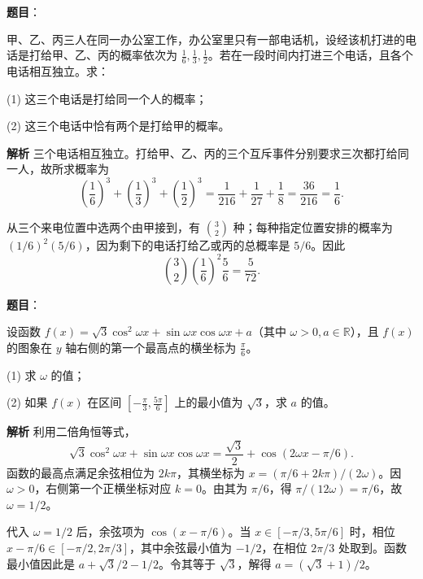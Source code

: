 \begin{answer}

\textbf{题目}：

甲、乙、丙三人在同一办公室工作，办公室里只有一部电话机，设经该机打进的电话是打给甲、乙、丙的概率依次为 \(\frac16,\frac13,\frac12\)。若在一段时间内打进三个电话，且各个电话相互独立。求：

(1) 这三个电话是打给同一个人的概率；

(2) 这三个电话中恰有两个是打给甲的概率。

\textbf{解析}
三个电话相互独立。打给甲、乙、丙的三个互斥事件分别要求三次都打给同一人，故所求概率为
\nopagebreak[4]
\[
\left(\frac16\right)^3+\left(\frac13\right)^3+\left(\frac12\right)^3
=\frac1{216}+\frac1{27}+\frac18=\frac{36}{216}=\frac16.
\]

从三个来电位置中选两个由甲接到，有 \(\binom32\) 种；每种指定位置安排的概率为 \((1/6)^2(5/6)\)，因为剩下的电话打给乙或丙的总概率是 \(5/6\)。因此
\nopagebreak[4]
\[
\binom32\left(\frac16\right)^2\frac56=\frac5{72}.
\]



\end{answer}
\begin{answer}

\textbf{题目}：

设函数 \(f(x)=\sqrt3\cos^2\omega x+\sin\omega x\cos\omega x+a\)（其中 \(\omega>0, a\in\mathbb R\)），且 \(f(x)\) 的图象在 \(y\) 轴右侧的第一个最高点的横坐标为 \(\frac\pi6\)。

(1) 求 \(\omega\) 的值；

(2) 如果 \(f(x)\) 在区间 \(\left[-\frac\pi3,\frac{5\pi}6\right]\) 上的最小值为 \(\sqrt3\)，求 \(a\) 的值。

\textbf{解析}
利用二倍角恒等式，
\nopagebreak[4]
\[
\sqrt3\cos^2\omega x+\sin\omega x\cos\omega x
=\frac{\sqrt3}{2}+\cos(2\omega x-\pi/6).
\]
函数的最高点满足余弦相位为 \(2k\pi\)，其横坐标为 \(x=(\pi/6+2k\pi)/(2\omega)\)。因 \(\omega>0\)，右侧第一个正横坐标对应 \(k=0\)。由其为 \(\pi/6\)，得 \(\pi/(12\omega)=\pi/6\)，故 \(\omega=1/2\)。

代入 \(\omega=1/2\) 后，余弦项为 \(\cos(x-\pi/6)\)。当 \(x\in[-\pi/3,5\pi/6]\) 时，相位 \(x-\pi/6\in[-\pi/2,2\pi/3]\)，其中余弦最小值为 \(-1/2\)，在相位 \(2\pi/3\) 处取到。函数最小值因此是 \(a+\sqrt3/2-1/2\)。令其等于 \(\sqrt3\)，解得 \(a=(\sqrt3+1)/2\)。



\end{answer}
